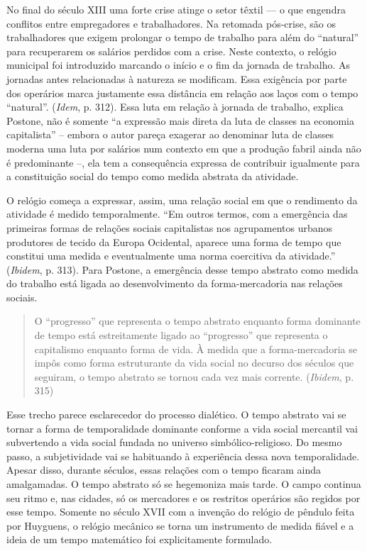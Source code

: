 No final do século XIII uma forte crise atinge o setor têxtil --- o que
engendra conflitos entre empregadores e trabalhadores. Na retomada
pós-crise, são os trabalhadores que exigem prolongar o tempo de trabalho
para além do ``natural'' para recuperarem os salários perdidos com a
crise. Neste contexto, o relógio municipal foi introduzido marcando o
início e o fim da jornada de trabalho. As jornadas antes relacionadas à
natureza se modificam. Essa exigência por parte dos operários marca
justamente essa distância em relação aos laços com o tempo ``natural''.
(\emph{Idem}, p. 312). Essa luta em relação à jornada de trabalho,
explica Postone, não é somente ``a expressão mais direta da luta de
classes na economia capitalista'' -- embora o autor pareça exagerar ao
denominar luta de classes moderna uma luta por salários num contexto em
que a produção fabril ainda não é predominante --, ela tem a
consequência expressa de contribuir igualmente para a constituição
social do tempo como medida abstrata da atividade.

O relógio começa a expressar, assim, uma relação social em que o
rendimento da atividade é medido temporalmente. ``Em outros termos, com
a emergência das primeiras formas de relações sociais capitalistas nos
agrupamentos urbanos produtores de tecido da Europa Ocidental, aparece
uma forma de tempo que constitui uma medida e eventualmente uma norma
coercitiva da atividade.'' (\emph{Ibidem}, p. 313). Para Postone, a
emergência desse tempo abstrato como medida do trabalho está ligada ao
desenvolvimento da forma-mercadoria nas relações sociais.

\begin{quote}
O ``progresso'' que representa o tempo abstrato enquanto forma dominante
de tempo está estreitamente ligado ao ``progresso'' que representa o
capitalismo enquanto forma de vida. À medida que a forma-mercadoria se
impôs como forma estruturante da vida social no decurso dos séculos que
seguiram, o tempo abstrato se tornou cada vez mais corrente.
(\emph{Ibidem}, p. 315)
\end{quote}

Esse trecho parece esclarecedor do processo dialético. O tempo abstrato
vai se tornar a forma de temporalidade dominante conforme a vida social
mercantil vai subvertendo a vida social fundada no universo
simbólico-religioso. Do mesmo passo, a subjetividade vai se habituando à
experiência dessa nova temporalidade. Apesar disso, durante séculos,
essas relações com o tempo ficaram ainda amalgamadas. O tempo abstrato
só se hegemoniza mais tarde. O campo continua seu ritmo e, nas cidades,
só os mercadores e os restritos operários são regidos por esse tempo.
Somente no século XVII com a invenção do relógio de pêndulo feita por
Huyguens, o relógio mecânico se torna um instrumento de medida fiável e
a ideia de um tempo matemático foi explicitamente formulado.

